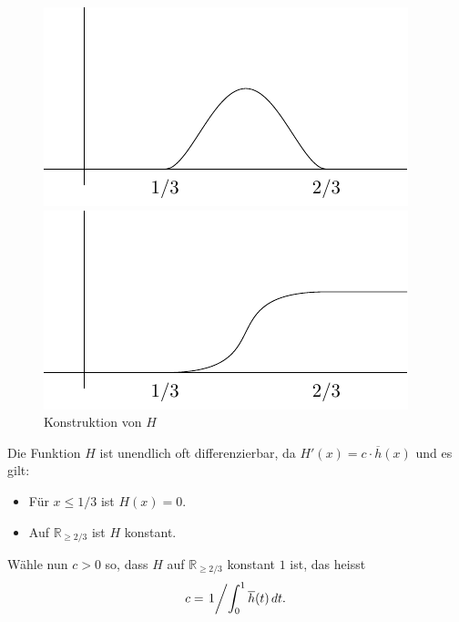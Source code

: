 \documentclass[../main.tex]{subfiles}
\begin{document}
\begin{examples}
\begin{enumerate}[(1)]
      \begin{figure}[htb] 
        \centering
        \begin{minipage}{0.50\textwidth}
          \centering
          \includegraphics{images/partition-integrand}
        \end{minipage}%
        \begin{minipage}{0.50\textwidth}
          \centering
          \includegraphics{images/partition-integrated}
        \end{minipage}%
        \caption{Konstruktion von $H$}%
        \label{fig:partition}
      \end{figure}

      Die Funktion $H$ ist unendlich oft differenzierbar,
      da $H'(x) = c \cdot \overline h(x)$ und es gilt:
       \begin{itemize}
         \item Für $x \leq 1/3$ ist $H(x) = 0$.
         \item Auf $\mathbb{R}_{\geq 2/3}$ ist $H$ konstant.
      \end{itemize}
      Wähle nun $c > 0$ so, dass $H$ 
      auf $\mathbb{R}_{\geq 2/3}$ konstant $1$ ist,
      das heisst
      \[
        c = \left. 1 \middle/ \int_{0}^{1} \overline h(t) \, dt.\right.
      \]
      

\end{enumerate}
\end{examples}
\end{document}
